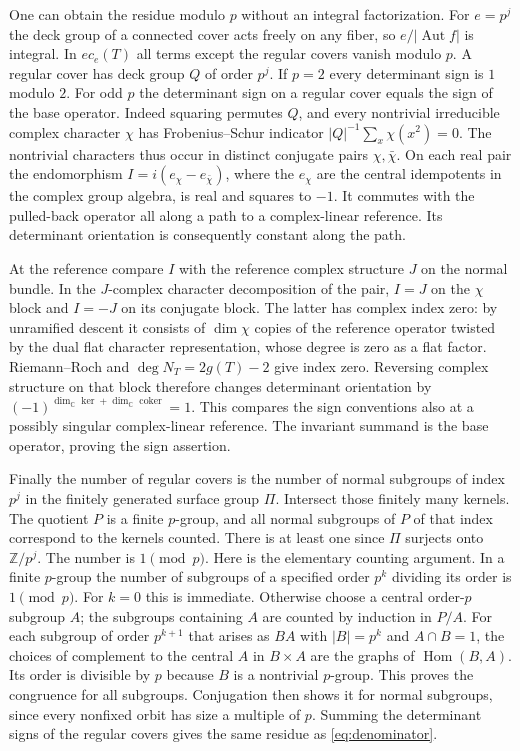 One can obtain the residue modulo \(p\) without an integral factorization. For \(e=p^j\) the deck group of a connected cover acts freely on any fiber, so \(e/|\operatorname{Aut}f|\) is integral. In \(e c_e(T)\) all terms except the regular covers vanish modulo \(p\). A regular cover has deck group \(Q\) of order \(p^j\). If \(p=2\) every determinant sign is \(1\) modulo \(2\). For odd \(p\) the determinant sign on a regular cover equals the sign of the base operator. Indeed squaring permutes \(Q\), and every nontrivial irreducible complex character \(\chi\) has Frobenius--Schur indicator \(|Q|^{-1}\sum_x\chi(x^2)=0\). The nontrivial characters thus occur in distinct conjugate pairs \(\chi,\bar\chi\). On each real pair the endomorphism \(I=i(e_\chi-e_{\bar\chi})\), where the \(e_\chi\) are the central idempotents in the complex group algebra, is real and squares to \(-1\). It commutes with the pulled-back operator all along a path to a complex-linear reference. Its determinant orientation is consequently constant along the path.

At the reference compare \(I\) with the reference complex structure \(J\) on the normal bundle. In the \(J\)-complex character decomposition of the pair, \(I=J\) on the \(\chi\) block and \(I=-J\) on its conjugate block. The latter has complex index zero: by unramified descent it consists of \(\dim\chi\) copies of the reference operator twisted by the dual flat character representation, whose degree is zero as a flat factor. Riemann--Roch and \(\deg N_T=2g(T)-2\) give index zero. Reversing complex structure on that block therefore changes determinant orientation by \((-1)^{\dim_\mathbb C\ker+\dim_\mathbb C\operatorname{coker}}=1\). This compares the sign conventions also at a possibly singular complex-linear reference. The invariant summand is the base operator, proving the sign assertion.

Finally the number of regular covers is the number of normal subgroups of index \(p^j\) in the finitely generated surface group \(\Pi\). Intersect those finitely many kernels. The quotient \(P\) is a finite \(p\)-group, and all normal subgroups of \(P\) of that index correspond to the kernels counted. There is at least one since \(\Pi\) surjects onto \(\mathbb Z/p^j\). The number is \(1\pmod p\). Here is the elementary counting argument. In a finite \(p\)-group the number of subgroups of a specified order \(p^k\) dividing its order is \(1\pmod p\). For \(k=0\) this is immediate. Otherwise choose a central order-\(p\) subgroup \(A\); the subgroups containing \(A\) are counted by induction in \(P/A\). For each subgroup of order \(p^{k+1}\) that arises as \(BA\) with \(|B|=p^k\) and \(A\cap B=1\), the choices of complement to the central \(A\) in \(B\times A\) are the graphs of \(\operatorname{Hom}(B,A)\). Its order is divisible by \(p\) because \(B\) is a nontrivial \(p\)-group. This proves the congruence for all subgroups. Conjugation then shows it for normal subgroups, since every nonfixed orbit has size a multiple of \(p\). Summing the determinant signs of the regular covers gives the same residue as \eqref{eq:denominator}.


